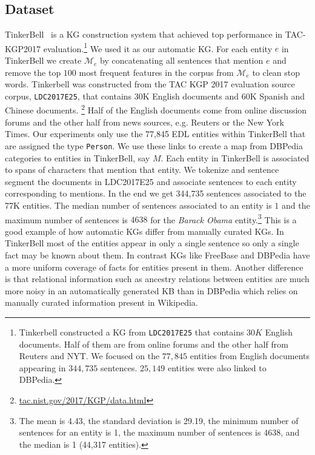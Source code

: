 \documentclass[a4paper]{article}
\newcommand{\cM}{\mathcal{M}}
\newcommand{\nvge}{NVSE\xspace}
\newcommand{\mycite}[1]{\cite{#1}}%
\begin{document}
%

\subsection{Dataset}
TinkerBell~\mycite{tinkerbell2017Tac} is a KG construction
system  that achieved top performance in TAC-KGP2017
evaluation.\footnote{Tinkerbell constructed a KG from %
\texttt{LDC2017E25} %
that contains $30K$ English documents.
Half of them are from online forums and
the other half from Reuters and NYT.
We focused on the $77,845$ entities from English documents appearing in $344,735$ sentences.
$25,149$ entities were also linked to DBPedia.}
We used it as our automatic KG. For each entity $e$ in TinkerBell we create $\cM_e$ by %
concatenating all %
sentences that mention $e$ and  remove the top $100$ most frequent features in the corpus from $\cM_e$ to clean stop words.
Tinkerbell was constructed from the TAC KGP 2017 evaluation source
corpus, \texttt{LDC2017E25}, that contains 30K English documents and 60K Spanish and Chinese documents. \footnote{\url{tac.nist.gov/2017/KGP/data.html}}
Half of the English documents come from online discussion forums and the other half from
news sources, e.g. Reuters or the New York Times.
Our experiments only use the 77,845 EDL entities within TinkerBell that are assigned the type \texttt{Person}. We use these links to create a map from DBPedia categories to entities in TinkerBell, say $M$. Each entity in TinkerBell is associated to spans of characters that mention that entity. We tokenize and sentence segment the documents in LDC2017E25 and associate sentences to each entity corresponding to mentions. In the end we get 344,735 sentences associated to the 77K entities. The median number of sentences associated to an entity is $1$ and the maximum number of sentences is $4638$ for the \textit{Barack Obama} entity.\footnote{The mean is 4.43, %
the standard deviation is 29.19, %
the minimum number of sentences for an entity is 1,
the maximum number of sentences is 4638,
and the median is 1 (44,317 entities).} This is a good example of how automatic KGs differ from manually curated KGs. In TinkerBell most of the entities appear in only a single sentence so only a single fact may be known about them. In contrast KGs like FreeBase and DBPedia have a more uniform coverage of facts for entities present in them. Another difference is that relational information such as ancestry relations between entities are much more noisy in an automatically generated KB than in DBPedia which relies on manually curated information present in Wikipedia.
\end{document}

